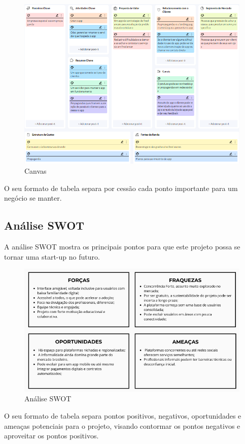 \documentclass[
  a4paper,%
  12pt,%
  english,%
  brazilian,%
]{article}
\begin{document}
\begin{figure}[h]
\centering
\caption{Canvas}%
\label{fig:diagrama-objetos}
 \includegraphics[width=1\textwidth]{fotos/canvas.png}
\end{figure}

    O seu formato de tabela separa por cessão cada ponto importante para um negócio se manter.

\break

\subsection*{Análise SWOT}

    A análise SWOT mostra os principais pontos para que este projeto possa se tornar uma start-up no futuro.

\begin{figure}[h]
\centering
\caption{Análise SWOT}%
\label{fig:diagrama-objetos}
 \includegraphics[width=1\textwidth]{fotos/AnaliseSWOT.png}
\end{figure}

    O seu formato de tabela separa pontos positivos, negativos, oportunidades e ameaças potenciais para o projeto, visando contormar os pontos negativos e aproveitar os pontos positivos.
\end{document}
